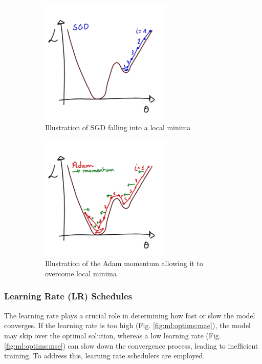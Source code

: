 \documentclass[../main.tex]{subfiles}
\begin{document}
\begin{figure}
  \centering
  \begin{subfigure}[t]{0.48\linewidth}
    \includegraphics[height=6cm]{images/ml/sgd.jpg}
    \caption{Illustration of SGD falling into a local minima}
    \label{fig:ml:sgd}
  \end{subfigure}
  \hfill
  \begin{subfigure}[t]{0.48\linewidth}
    \includegraphics[height=6cm]{images/ml/Adam.jpg}
    \caption{Illustration of the Adam momentum allowing it to overcome local minima}
    \label{fig:ml:adam}
  \end{subfigure}
  \caption{}
\end{figure}

\subsubsection{Learning Rate (LR) Schedules}

The learning rate plays a crucial role in determining how fast or slow the model converges. If the learning rate is too high (Fig. \ref{fig:ml:optims:mae}), the model may skip over the optimal solution, whereas a low learning rate (Fig. \ref{fig:ml:optims:mse}) can slow down the convergence process, leading to inefficient training. To address this, learning rate schedulers are employed.
\end{document}
